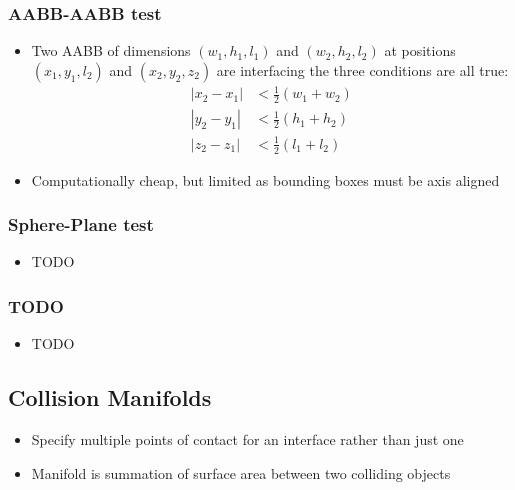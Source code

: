 \documentclass[a4paper]{article}
\begin{document}
\subsubsection{AABB-AABB test}

\begin{itemize}
  \item
    Two AABB of dimensions $(w_{1}, h_{1}, l_{1})$ and $(w_{2}, h_{2}, l_{2})$
    at positions $(x_{1}, y_{1}, l_{2})$ and $(x_{2}, y_{2}, z_{2})$ are
    interfacing the three conditions are all true:
    \begin{align*}
      |x_{2} - x_{1}| &< \frac{1}{2}(w_{1} + w_{2}) \\
      |y_{2} - y_{1}| &< \frac{1}{2}(h_{1} + h_{2}) \\
      |z_{2} - z_{1}| &< \frac{1}{2}(l_{1} + l_{2})
    \end{align*}

  \item
    Computationally cheap, but limited as bounding boxes must be axis aligned

\end{itemize}

\subsubsection{Sphere-Plane test}

\begin{itemize}
  \item
    TODO

\end{itemize}

\subsubsection{TODO}

\begin{itemize}
  \item
    TODO

\end{itemize}

\subsection{Collision Manifolds}

\begin{itemize}
  \item
    Specify multiple points of contact for an interface rather than just one

  \item
    Manifold is summation of surface area between two colliding objects

\end{itemize}
\end{document}
